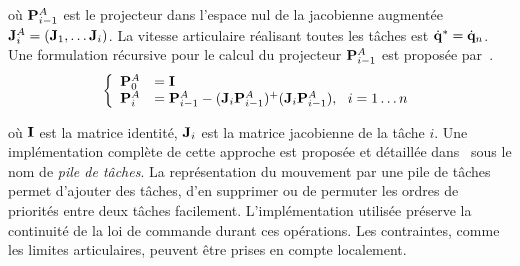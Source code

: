 \noindent où ${\mathbf{P}}_{i-1}^{A}$ est le projecteur
dans l'espace nul de la jacobienne augmentée
${\mathbf{J}}_i^A = ({\mathbf{J}}_1, \ldots {\mathbf{J}}_i)$.
La vitesse articulaire
réalisant toutes les t\^aches est $\dot{{\mathbf{q}}}^* = \dot{{\mathbf{q}}}_n$.
Une formulation récursive pour le calcul du projecteur ${\mathbf{P}}_{i-1}^{A}$ 
est proposée par~\cite{baerlocher98}.
\begin{equation}
  \left\{
      \begin{array}{rl}
        \mbf{P}_0^A &= \mbf{I}\\
        \mbf{P}_i^A &= \mbf{P}_{i-1}^A - (\mbf{J}_i \mbf{P}_{i-1}^A)^+(\mbf{J}_i \mbf{P}_{i-1}^A) , \ \ i = 1 \ldots n
      \end{array}
    \right.
    \label{eq:projector}
\end{equation}

\noindent où ${\mathbf{I}}$ est la matrice identité, ${\mathbf{J}}_i$ est la matrice jacobienne de
la t\^ache $i$. 
Une implémentation complète de cette approche est proposée et 
détaillée dans~\cite{mansard07}
sous le nom de \emph{pile de t\^aches}. La représentation
du mouvement par une pile de t\^aches permet d'ajouter des t\^aches,
d'en supprimer ou de permuter les ordres de priorités entre deux t\^aches
facilement. L'implémentation utilisée préserve la continuité de la loi de commande
durant ces opérations. Les contraintes, comme les limites articulaires,
peuvent \^etre prises en compte localement.

